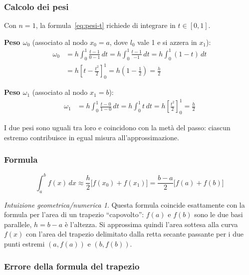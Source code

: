 \documentclass[a4paper,12pt]{article}
\theoremstyle{definition}
\theoremstyle{remark}
\newtheorem*{intuizione}{Intuizione geometrica/numerica}
\begin{document}
\subsubsection*{Calcolo dei pesi}

Con $n = 1$, la formula~\eqref{eq:pesi-t} richiede di integrare in
$t \in [0, 1]$.

\medskip\noindent
\textbf{Peso $\omega_0$} (associato al nodo $x_0 = a$, dove $l_0$
vale 1 e si azzera in $x_1$):
\begin{align*}
  \omega_0
  &= h \int_0^1 \frac{t - 1}{0 - 1}\,dt
   = h \int_0^1 \frac{t-1}{-1}\,dt
   = h \int_0^1 (1-t)\,dt \\
  &= h \left[t - \frac{t^2}{2}\right]_0^1
   = h \left(1 - \frac{1}{2}\right)
   = \frac{h}{2}
\end{align*}

\noindent
\textbf{Peso $\omega_1$} (associato al nodo $x_1 = b$):
\begin{align*}
  \omega_1
  &= h \int_0^1 \frac{t - 0}{1 - 0}\,dt
   = h \int_0^1 t\,dt
   = h \left[\frac{t^2}{2}\right]_0^1
   = \frac{h}{2}
\end{align*}

\noindent I due pesi sono uguali tra loro e coincidono con la metà del
passo: ciascun estremo contribuisce in egual misura all'approssimazione.

\subsubsection*{Formula}

\begin{equation}
  \boxed{
    \int_a^b f(x)\,dx
    \approx \frac{h}{2}\bigl[f(x_0) + f(x_1)\bigr]
    = \frac{b-a}{2}\bigl[f(a) + f(b)\bigr]
  }
  \label{eq:trapezio}
\end{equation}

\begin{intuizione}
Questa formula coincide esattamente con la formula per l'area di un
trapezio ``capovolto'': $f(a)$ e $f(b)$ sono le due basi parallele,
$h = b - a$ è l'altezza.
Si approssima quindi l'area sottesa alla curva $f(x)$ con l'area del
trapezio delimitato dalla retta secante passante per i due punti
estremi $(a,f(a))$ e $(b,f(b))$.
\end{intuizione}

\subsubsection*{Errore della formula del trapezio}
\end{document}

